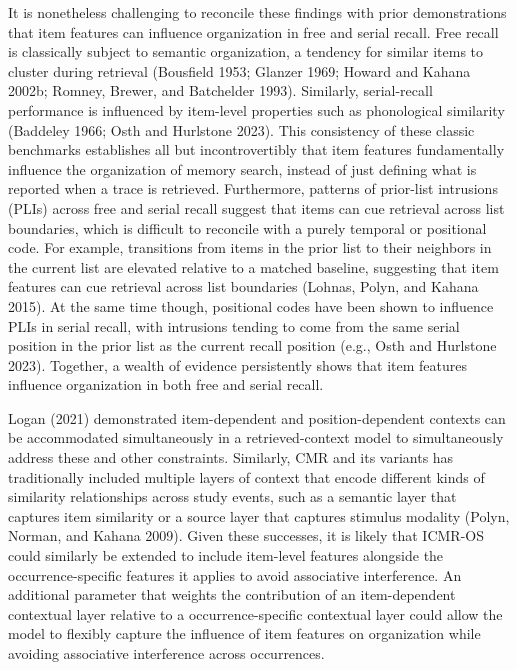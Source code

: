 \documentclass[
  letterpaper,
  11pt,
  english,
  singlespacing,
  headsepline]{MastersDoctoralThesis}
\begin{document}
It is nonetheless challenging to reconcile these findings with prior
demonstrations that item features can influence organization in free and
serial recall. Free recall is classically subject to semantic
organization, a tendency for similar items to cluster during retrieval
(Bousfield 1953; Glanzer 1969; Howard and Kahana 2002b; Romney, Brewer,
and Batchelder 1993). Similarly, serial-recall performance is influenced
by item-level properties such as phonological similarity (Baddeley 1966;
Osth and Hurlstone 2023). This consistency of these classic benchmarks
establishes all but incontrovertibly that item features fundamentally
influence the organization of memory search, instead of just defining
what is reported when a trace is retrieved. Furthermore, patterns of
prior-list intrusions (PLIs) across free and serial recall suggest that
items can cue retrieval across list boundaries, which is difficult to
reconcile with a purely temporal or positional code. For example,
transitions from items in the prior list to their neighbors in the
current list are elevated relative to a matched baseline, suggesting
that item features can cue retrieval across list boundaries (Lohnas,
Polyn, and Kahana 2015). At the same time though, positional codes have
been shown to influence PLIs in serial recall, with intrusions tending
to come from the same serial position in the prior list as the current
recall position (e.g., Osth and Hurlstone 2023). Together, a wealth of
evidence persistently shows that item features influence organization in
both free and serial recall.

Logan (2021) demonstrated item-dependent and position-dependent contexts
can be accommodated simultaneously in a retrieved-context model to
simultaneously address these and other constraints. Similarly, CMR and
its variants has traditionally included multiple layers of context that
encode different kinds of similarity relationships across study events,
such as a semantic layer that captures item similarity or a source layer
that captures stimulus modality (Polyn, Norman, and Kahana 2009). Given
these successes, it is likely that ICMR-OS could similarly be extended
to include item-level features alongside the occurrence-specific
features it applies to avoid associative interference. An additional
parameter that weights the contribution of an item-dependent contextual
layer relative to a occurrence-specific contextual layer could allow the
model to flexibly capture the influence of item features on organization
while avoiding associative interference across occurrences.
\end{document}
